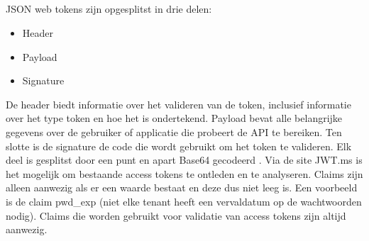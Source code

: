 \subsection{}
JSON web tokens zijn opgesplitst in drie delen:
\begin{itemize}
	\item Header
	\item Payload
	\item Signature
\end{itemize}
De header biedt informatie over het valideren van de token, inclusief informatie over het type token en hoe het is ondertekend. Payload bevat alle belangrijke gegevens over de gebruiker of applicatie die probeert de API te bereiken. Ten slotte is de signature de code die wordt gebruikt om het token te valideren. Elk deel is gesplitst door een punt en apart Base64 gecodeerd \autocite{hpsin2020}.\newline
Via de site JWT.ms is het mogelijk om bestaande access tokens te ontleden en te analyseren. Claims zijn alleen aanwezig als er een waarde bestaat en deze dus niet leeg is. Een voorbeeld is de claim pwd\_exp (niet elke tenant heeft een vervaldatum op de wachtwoorden nodig). Claims die worden gebruikt voor validatie van access tokens zijn altijd aanwezig.
